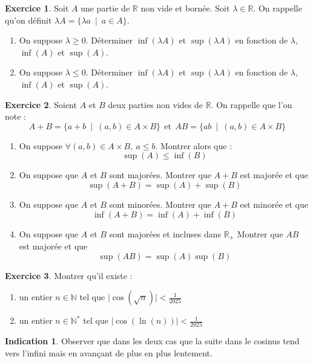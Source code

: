 \documentclass[french]{book}
\newcommand{\N}{\mathbb{N}}
\newcommand{\R}{\mathbb{R}}
\newcommand{\st}{^*}
\theoremstyle{definition}
\newtheorem{ex}{Exercice}[chapter]
\theoremstyle{theorem}
\newtheorem*{ind}{Indication}
\theoremstyle{remark}
\begin{document}
\begin{ex}
	Soit $A$ une partie de $\R$ non vide et bornée. Soit $\lambda\in\R$. On rappelle qu'on définit $\lambda A=\{\lambda a\ \mid \ a\in A\}$.
	\begin{enumerate}
		\item On suppose $\lambda\geqslant 0$. Déterminer $\inf(\lambda A)$ et $\sup(\lambda A)$ en fonction de $\lambda$, $\inf(A)$ et $\sup(A)$.
		\item On suppose $\lambda\leqslant 0$. Déterminer $\inf(\lambda A)$ et $\sup(\lambda A)$ en fonction de $\lambda$, $\inf(A)$ et $\sup(A)$.
	\end{enumerate}
\end{ex}

\begin{ex}
	Soient $A$ et $B$ deux parties non vides de $\R$. On rappelle que l'on note : $$A+B=\{a+b\ \mid\ (a,b)\in A\times B\}\ \ \text{et}\ \ AB=\{ab\ \mid\ (a,b)\in A\times B\}$$
	\begin{enumerate}
		\item On suppose $\forall (a,b)\in A\times B,\ a\leqslant b$. Montrer alors que : $$\sup(A)\leqslant\inf(B)$$
		\item On suppose que $A$ et $B$ sont majorées. Montrer que $A+B$ est majorée et que $$\sup(A+B)=\sup(A)+\sup(B)$$
		\item On suppose que $A$ et $B$ sont minorées. Montrer que $A+B$ est minorée et que $$\inf(A+B)=\inf(A)+\inf(B)$$
		\item On suppose que $A$ et $B$ sont majorées et incluses dans $\R_+$ Montrer que $AB$ est majorée et que $$\sup(AB)=\sup(A)\sup(B)$$
	\end{enumerate}
\end{ex}

\begin{ex}
	Montrer qu'il existe : 
	\begin{enumerate}
		\item un entier $n\in\N$ tel que $\lvert\cos(\sqrt{n})\rvert<\displaystyle\frac{1}{2025}$
		\item un entier $n\in\N\st$ tel que $\lvert\cos(\ln(n))\rvert<\displaystyle\frac{1}{2025}$
	\end{enumerate}
\end{ex}

\begin{ind}
	Observer que dans les deux cas que la suite dans le cosinus tend vers l'infini mais en avançant de plus en plus lentement.
\end{ind}
\end{document}
